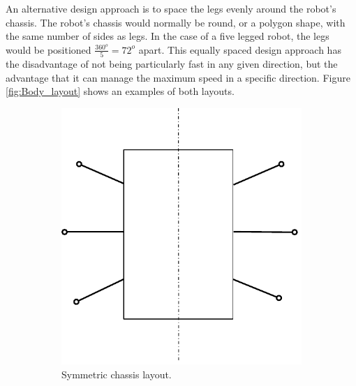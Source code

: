 An alternative design approach is to space the legs evenly around the robot's chassis. The robot's chassis would normally be round, or a polygon shape, with the same number of sides as legs. In the case of a five legged robot, the legs would be positioned $\frac{360^o}{5} = 72^o $ apart.
This equally spaced design approach has the disadvantage of not being particularly fast in any given direction, but the advantage that it can manage the maximum speed in a specific direction. Figure \ref{fig:Body_layout} shows an examples of both layouts.
\begin{figure}[t!]
    \centering
    \begin{subfigure}[t]{0.5\textwidth}
        \centering
        \includegraphics[scale = 0.6]{pics/Body_layout_hex.pdf}
        \caption{Symmetric chassis layout.}
    \end{subfigure}%
    ~ 
    \begin{subfigure}[t]{0.5\textwidth}
        \centering

\end{subfigure}
\end{figure}
